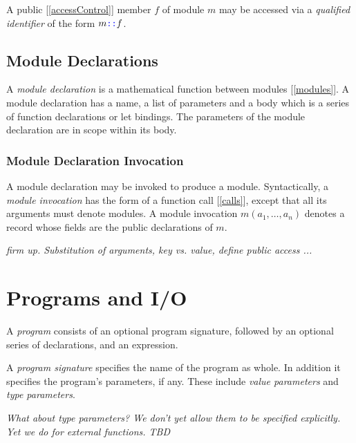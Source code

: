 \documentclass{article}
\begin{document}
A public [\ref{accessControl}] member  $f$ of module $m$ may be accessed via a {\em qualified identifier} of the form $m \texttt{\color{blue} ::}{} f$.




\subsection{Module Declarations}
\label{moduleDeclarations}

A {\em module declaration} is a mathematical function between modules [\ref{modules}].  A module declaration has a name, a list of parameters and a body which is a series of function declarations or let bindings.  The parameters  of the module declaration are in scope within its body.

\subsubsection{Module Declaration Invocation}
\label{moduleDeclarationInvocation}

A module declaration may be invoked to produce a module. Syntactically, a {\em module invocation} has the form of a function call [\ref{calls}], except that all its arguments must denote modules.
A module invocation $m(a_1, \ldots, a_n)$ denotes a record whose fields are the public declarations of $m$.

{\em firm up. Substitution of arguments, key vs. value, define public access ...}

\section{Programs and I/O}
\label{programsAndIO}

A {\em program} consists of an optional  program signature, followed by an optional  series of declarations, and an expression.

\Program{}

A {\em program signature} specifies the name of the program as whole. In addition it specifies the program's parameters, if any.  These include {\em value parameters} and {\em type parameters}. 

\ProgramSignature{}

\ProgramParameterList{}

\ProgramParameter{}

\TypeSigSuffix{}

{\em What about type parameters? We don't yet allow them to be specified explicitly. Yet we do for external functions. TBD }
\end{document}
